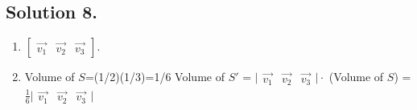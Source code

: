 \documentclass{article}
\begin{document}
\subsection*{Solution 8.}
\begin{enumerate} [label=(\arabic*)]
    \item $[\begin{array}{ccc}\Vec{v_1}&\Vec{v_2}&\Vec{v_3}\end{array}]$.
    \item Volume of $S$=(1/2)(1/3)=1/6\newline
    Volume of $S'$ = $\vert \begin{array}{ccc}\Vec{v_1}&\Vec{v_2}&\Vec{v_3}\end{array}\vert\cdot$ (Volume of $S$)
    =$\frac{1}{6}\vert \begin{array}{ccc}\Vec{v_1}&\Vec{v_2}&\Vec{v_3}\end{array}\vert$
\end{enumerate}
\end{document}
